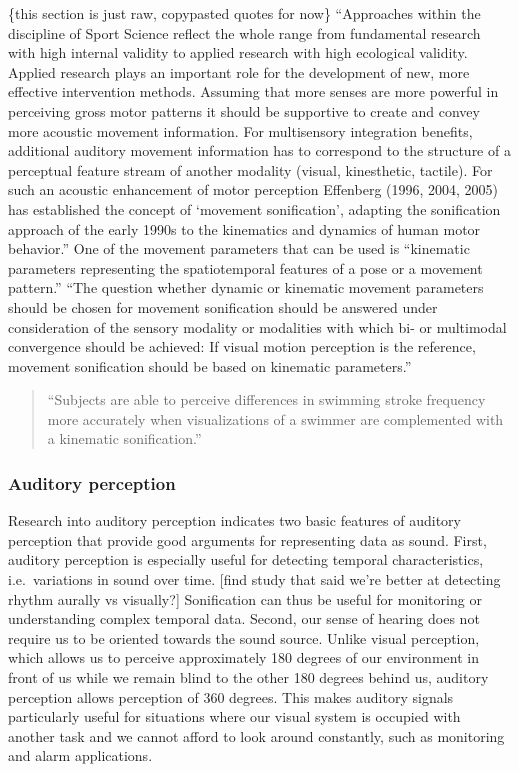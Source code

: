 \documentclass[10pt,a4paper,onecolumn]{article}
\begin{document}
\{this section is just raw, copypasted quotes for now\}
``Approaches within the discipline of Sport Science reflect the whole range from fundamental research with high internal validity to applied research with high ecological validity. Applied research plays an important role for the development of new, more effective intervention methods. Assuming that more senses are more powerful in perceiving gross motor patterns it should be supportive to create and convey more acoustic movement information. For multisensory integration benefits, additional auditory movement information has to correspond to the structure of a perceptual feature stream of another modality (visual, kinesthetic, tactile). For such an acoustic enhancement of motor perception Effenberg (1996, 2004, 2005) has established the concept of `movement sonification', adapting the sonification approach of the early 1990s to the kinematics and dynamics of human motor behavior.'' One of the movement parameters that can be used is ``kinematic parameters representing the spatiotemporal features of a pose or a movement pattern.'' ``The question whether dynamic or kinematic movement parameters should be chosen for movement sonification should be answered under consideration of the sensory modality or modalities with which bi- or multimodal convergence should be achieved: If visual motion perception is the reference, movement sonification should be based on kinematic parameters.'' \autocite{gerdschmitzSoundJoinedActions2017}

\begin{quote}
``Subjects are able to perceive differences in swimming stroke frequency more accurately when visualizations of a swimmer are complemented with a kinematic sonification.'' \autocite{gerdschmitzSoundJoinedActions2017}
\end{quote}

\hypertarget{auditory-perception}{%
\subsubsection{Auditory perception}\label{auditory-perception}}

Research into auditory perception indicates two basic features of auditory perception that provide good arguments for representing data as sound. First, auditory perception is especially useful for detecting temporal characteristics, i.e.~variations in sound over time. {[}find study that said we're better at detecting rhythm aurally vs visually?{]} Sonification can thus be useful for monitoring or understanding complex temporal data. Second, our sense of hearing does not require us to be oriented towards the sound source. Unlike visual perception, which allows us to perceive approximately 180 degrees of our environment in front of us while we remain blind to the other 180 degrees behind us, auditory perception allows perception of 360 degrees. This makes auditory signals particularly useful for situations where our visual system is occupied with another task and we cannot afford to look around constantly, such as monitoring and alarm applications. \autocite{kramerSonificationReportStatus1999}
\end{document}
